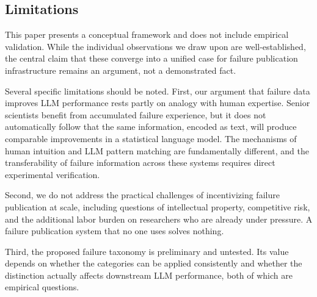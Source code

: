 \subsection{Limitations}

This paper presents a conceptual framework and does not include
empirical validation. While the individual observations we draw
upon are well-established, the central claim that these converge
into a unified case for failure publication infrastructure remains
an argument, not a demonstrated fact.

Several specific limitations should be noted. First, our argument
that failure data improves LLM performance rests partly on analogy
with human expertise. Senior scientists benefit from accumulated
failure experience, but it does not automatically follow that the
same information, encoded as text, will produce comparable
improvements in a statistical language model. The mechanisms of
human intuition and LLM pattern matching are fundamentally
different, and the transferability of failure information across
these systems requires direct experimental verification.

Second, we do not address the practical challenges of incentivizing
failure publication at scale, including questions of intellectual
property, competitive risk, and the additional labor burden on
researchers who are already under pressure. A failure publication
system that no one uses solves nothing.

Third, the proposed failure taxonomy is preliminary and untested.
Its value depends on whether the categories can be applied
consistently and whether the distinction actually affects downstream
LLM performance, both of which are empirical questions.